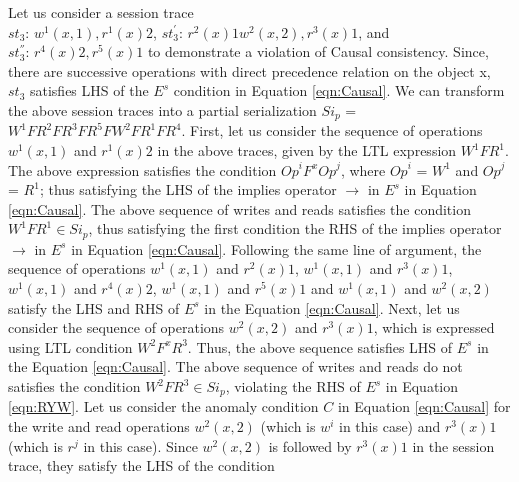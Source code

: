 \documentclass{sig-alternate-05-2015}
\begin{document}
 \par Let us consider a session trace \\ $\mathit{st}_3$: $w^1(x,1), r^1(x){2}$, $\mathit{st}_3^{'}$: $r^2(x){1} w^2(x,2), r^3(x){1}$, and \\ $\mathit{st}_3^{''}$: $r^4(x){2}, r^5(x){1}$ to demonstrate
 a violation of Causal consistency. Since, there are successive operations with direct precedence relation on the object x, $\mathit{st}_3$
 satisfies LHS of the $E^s$ condition in Equation \ref{eqn:Causal}.  We can transform
 the above session traces into a partial serialization $\mathit{Si}_p$ =
 $W^1 F R^2 F R^3 F R^5 F W^2 F R^1 F R^4$. First, let us consider the sequence of operations
 $w^1(x,1)$ and $r^1(x){2}$ in the above traces, given by the LTL expression $W^1 F R^1$. The above expression satisfies
 the condition $\mathit{Op}^i F^x \mathit{Op}^j$, where $\mathit{Op}^i$ = $W^1$ and $\mathit{Op}^j$ = $R^1$;
 thus satisfying the LHS of the implies operator $\rightarrow$ in $E^s$ in Equation \ref{eqn:Causal}. The above sequence of
 writes and reads satisfies the condition $W^1 F R^1 \in \mathit{Si}_p$, thus satisfying the first condition the RHS of
 the implies operator $\rightarrow$ in $E^s$ in Equation \ref{eqn:Causal}.
 Following the same line of argument, the sequence of operations
  $w^1(x,1)$ and $r^2(x){1}$, $w^1(x,1)$ and $r^3(x){1}$, $w^1(x,1)$ and $r^4(x){2}$, $w^1(x,1)$ and $r^5(x){1}$
  and $w^1(x,1)$ and  $w^2(x,2)$ satisfy the LHS and RHS of $E^s$ in the Equation \ref{eqn:Causal}. Next, let us consider
  the sequence of operations $w^2(x,2)$ and $r^3(x){1}$, which is expressed using LTL condition $W^2 F^x R^3$.
  Thus, the above sequence satisfies LHS of $E^s$ in the Equation \ref{eqn:Causal}. The above sequence of
 writes and reads do not satisfies the condition $W^2 F R^3 \in \mathit{Si}_p$, violating the RHS of $E^s$ in Equation \ref{eqn:RYW}.
  Let us consider the anomaly condition $C$ in Equation \ref{eqn:Causal} for the write and read operations $w^2(x,2)$ (which is
  $w^i$ in this case) and $r^3(x){1}$ (which is $r^j$ in this case). Since  $w^2(x,2)$ is followed by $r^3(x){1}$ in the session trace, they satisfy the LHS of the condition
\end{document}

